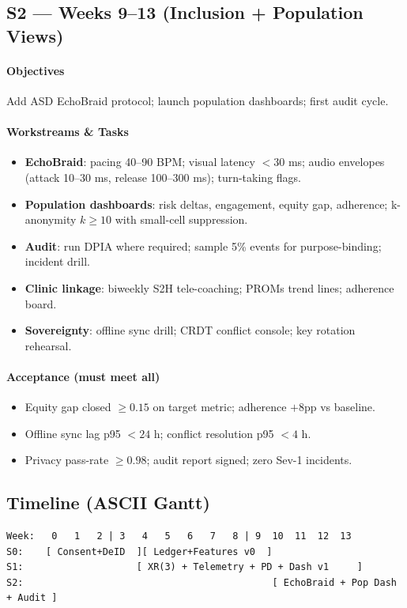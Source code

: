 \documentclass[11pt]{article}
\theoremstyle{plain}
\begin{document}
\subsection{S2 — Weeks 9–13 (Inclusion + Population Views)}
\paragraph{Objectives}
Add ASD EchoBraid protocol; launch population dashboards; first audit cycle.

\paragraph{Workstreams \& Tasks}
\begin{itemize}
  \item \textbf{EchoBraid}: pacing 40–90 BPM; visual latency $<30$ ms; audio envelopes (attack 10–30 ms, release 100–300 ms); turn-taking flags.
  \item \textbf{Population dashboards}: risk deltas, engagement, equity gap, adherence; k-anonymity $k\ge 10$ with small-cell suppression.
  \item \textbf{Audit}: run DPIA where required; sample 5\% events for purpose-binding; incident drill.
  \item \textbf{Clinic linkage}: biweekly S2H tele-coaching; PROMs trend lines; adherence board.
  \item \textbf{Sovereignty}: offline sync drill; CRDT conflict console; key rotation rehearsal.
\end{itemize}

\paragraph{Acceptance (must meet all)}
\begin{itemize}
  \item Equity gap closed $\ge 0.15$ on target metric; adherence $+8$pp vs baseline.
  \item Offline sync lag p95 $<24$ h; conflict resolution p95 $<4$ h.
  \item Privacy pass-rate $\ge 0.98$; audit report signed; zero Sev-1 incidents.
\end{itemize}

\subsection{Timeline (ASCII Gantt)}
\begin{verbatim}
Week:   0   1   2 | 3   4   5   6   7   8 | 9  10  11  12  13
S0:    [ Consent+DeID  ][ Ledger+Features v0  ]
S1:                    [ XR(3) + Telemetry + PD + Dash v1     ]
S2:                                            [ EchoBraid + Pop Dash + Audit ]
\end{verbatim}
\end{document}
